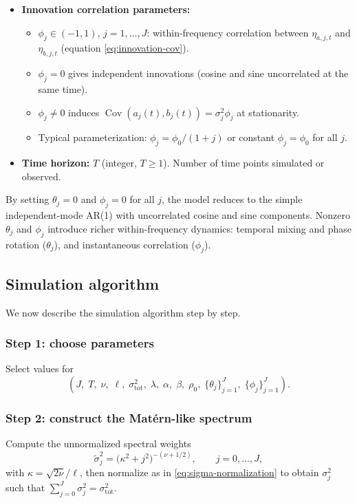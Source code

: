 \documentclass[answers,12pt,addpoints]{exam}
\begin{document}
\begin{itemize}
  \item \textbf{Innovation correlation parameters:}
    \begin{itemize}
      \item $\phi_j \in (-1,1)$, $j=1,\dots,J$: within-frequency correlation between $\eta_{a,j,t}$ and $\eta_{b,j,t}$ (equation \eqref{eq:innovation-cov}).
      \item $\phi_j = 0$ gives independent innovations (cosine and sine uncorrelated at the same time).
      \item $\phi_j \neq 0$ induces $\operatorname{Cov}(a_j(t), b_j(t)) = \sigma_j^2\phi_j$ at stationarity.
      \item Typical parameterization: $\phi_j = \phi_0 / (1+j)$ or constant $\phi_j = \phi_0$ for all $j$.
    \end{itemize}

  \item \textbf{Time horizon:} $T$ (integer, $T\ge 1$). Number of time points simulated or observed.

\end{itemize}

By setting $\theta_j = 0$ and $\phi_j = 0$ for all $j$, the model reduces to the simple independent-mode AR(1) with uncorrelated cosine and sine components. Nonzero $\theta_j$ and $\phi_j$ introduce richer within-frequency dynamics: temporal mixing and phase rotation ($\theta_j$), and instantaneous correlation ($\phi_j$).

\subsection{Simulation algorithm}

We now describe the simulation algorithm step by step.

\subsubsection*{Step 1: choose parameters}

Select values for
\[
  (J,\; T,\; \nu,\; \ell,\; \sigma^2_{\text{tot}},\; \lambda,\; \alpha,\; \beta,\; \rho_0,\; \{\theta_j\}_{j=1}^J,\; \{\phi_j\}_{j=1}^J).
\]

\subsubsection*{Step 2: construct the Matérn-like spectrum}

Compute the unnormalized spectral weights
\[
  \tilde{\sigma}_j^2
  = \bigl(\kappa^2 + j^2\bigr)^{-(\nu + 1/2)},
  \qquad j = 0,\dots,J,
\]
with $\kappa = \sqrt{2\nu}/\ell$, then normalize as in \eqref{eq:sigma-normalization} to obtain $\sigma_j^2$ such that $\sum_{j=0}^{J} \sigma_j^2 = \sigma^2_{\text{tot}}$.
\end{document}

